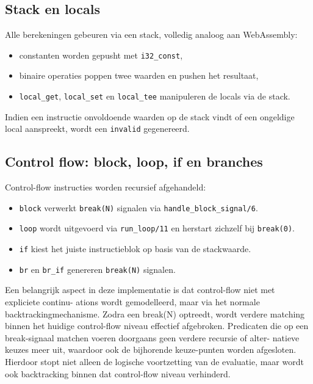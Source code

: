 \documentclass[a4paper,11pt]{article}
\begin{document}
\subsection*{Stack en locals}

Alle berekeningen gebeuren via een stack, volledig analoog aan WebAssembly:

\begin{itemize}
    \item constanten worden gepusht met \texttt{i32\_const},
    \item binaire operaties poppen twee waarden en pushen het resultaat,
    \item \texttt{local\_get}, \texttt{local\_set} en \texttt{local\_tee} manipuleren de locals via de stack.
\end{itemize}

Indien een instructie onvoldoende waarden op de stack vindt of een ongeldige local aanspreekt, wordt een \texttt{invalid} gegenereerd.

\subsection*{Control flow: block, loop, if en branches}

Control-flow instructies worden recursief afgehandeld:

\begin{itemize}
    \item \texttt{block} verwerkt \texttt{break(N)} signalen via \texttt{handle\_block\_signal/6}.
    \item \texttt{loop} wordt uitgevoerd via \texttt{run\_loop/11} en herstart zichzelf bij \texttt{break(0)}.
    \item \texttt{if} kiest het juiste instructieblok op basis van de stackwaarde.
    \item \texttt{br} en \texttt{br\_if} genereren \texttt{break(N)} signalen.
\end{itemize}

Een belangrijk aspect in deze implementatie is dat control-flow niet met expliciete continu-
ations wordt gemodelleerd, maar via het normale backtrackingmechanisme. Zodra een break(N)
optreedt, wordt verdere matching binnen het huidige control-flow niveau effectief afgebroken.
Predicaten die op een break-signaal matchen voeren doorgaans geen verdere recursie of alter-
natieve keuzes meer uit, waardoor ook de bijhorende keuze-punten worden afgesloten. Hierdoor
stopt niet alleen de logische voortzetting van de evaluatie, maar wordt ook backtracking binnen
dat control-flow niveau verhinderd.
\end{document}
